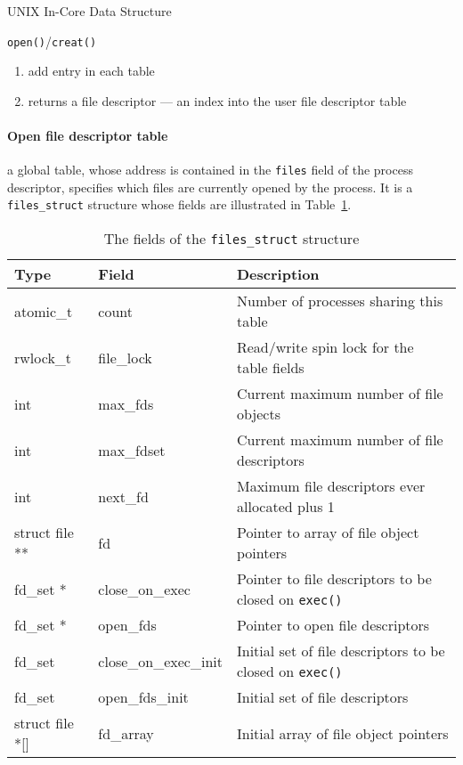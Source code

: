 \begin{frame}{UNIX In-Core Data Structure}
  \centering
  \begin{block}{\texttt{open()}/\texttt{creat()}}
    \begin{enumerate}
    \item add entry in each table
    \item returns a \alert{file descriptor} --- an index into the user file descriptor table
    \end{enumerate}
  \end{block}
\end{frame}

\paragraph{Open file descriptor table}

a global table, whose address is contained in the \texttt{files} field of the process
descriptor, specifies which files are currently opened by the process. It is a
\texttt{files\_struct} structure whose fields are illustrated in
Table~\ref{tbl:filestruct}.

\begin{table}[!h]
  \centering
  \caption{The fields of the \texttt{files\_struct} structure}
  \label{tbl:filestruct}%
  \begin{tabularx}{\textwidth}{>{\ttfamily}l>{\ttfamily}lX}
    \toprule
    \textbf{Type}   &\textbf{Field}&\textbf{Description}\\\midrule
    atomic\_t       &count&Number of processes sharing this table\\
    rwlock\_t       &file\_lock&Read/write spin lock for the table fields\\
    int             &max\_fds&Current maximum number of file objects\\
    int             &max\_fdset&Current maximum number of file descriptors\\
    int             &next\_fd&Maximum file descriptors ever allocated plus 1\\
    struct file **  &fd&Pointer to array of file object pointers\\
    fd\_set *       &close\_on\_exec&Pointer to file descriptors to be closed on \texttt{exec()}\\
    fd\_set *       &open\_fds&Pointer to open file descriptors\\
    fd\_set         &close\_on\_exec\_init&Initial set of file descriptors to be closed on \texttt{exec()}\\
    fd\_set         &open\_fds\_init&Initial set of file descriptors\\
    struct file *[] &fd\_array&Initial array of file object pointers\\\bottomrule
  \end{tabularx}
\end{table}
  
